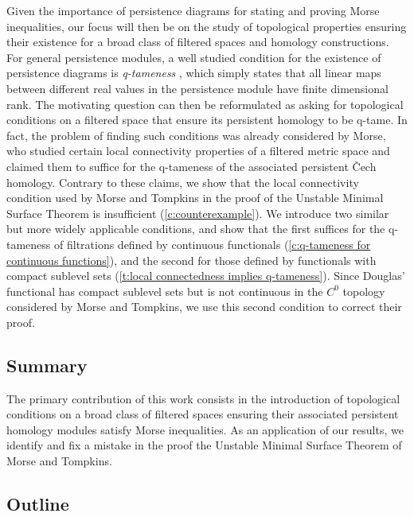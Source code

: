 Given the importance of persistence diagrams for stating and proving Morse inequalities, our focus will then be on the study of topological properties ensuring their existence for a broad class of filtered spaces and homology constructions.
For general persistence modules, a well studied condition for the existence of persistence diagrams is \emph{q-tameness} \cite{Chazal.2016a,Chazal.2016b}, which simply states that all linear maps between different real values in the persistence module have finite dimensional rank.
The motivating question can then be reformulated as asking for topological conditions on a filtered space that ensure its persistent homology to be q-tame.
In fact, the problem of finding such conditions was already considered by Morse, who studied certain local connectivity properties of a filtered metric space and claimed them to suffice for the q-tameness of the associated persistent \v{C}ech homology.
Contrary to these claims, we show that the local connectivity condition used by Morse and Tompkins in the proof of the Unstable Minimal Surface Theorem is insufficient (\cref{c:counterexample}).
We introduce two similar but more widely applicable conditions, and show that the first suffices for the \mbox{q-tameness} of filtrations defined by continuous functionals (\cref{c:q-tameness for continuous functions}), and the second for those defined by functionals with compact sublevel sets (\cref{t:local connectedness implies q-tameness}).
Since Douglas' functional has compact sublevel sets but is not continuous in the $C^0$ topology considered by Morse and Tompkins, we use this second condition to correct their proof.

\subsection*{Summary}

The primary contribution of this work consists in the introduction of topological conditions on a broad class of filtered spaces ensuring their associated persistent homology modules satisfy Morse inequalities.
As an application of our results, we identify and fix a mistake in the proof the Unstable Minimal Surface Theorem of Morse and Tompkins. 

\subsection*{Outline}

